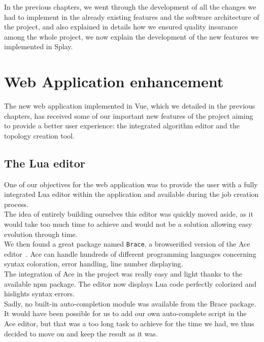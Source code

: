 \documentclass{eplmastersthesis}
\begin{document}
      In the previous chapters, we went through the development of all
      the changes we had to implement in the already existing features
      and the software architecture of the project, and also explained
      in details how we ensured quality insurance among the whole project,
      we now explain the development of the new features we implemented in
      Splay.

      \section{Web Application enhancement}

        The new web application implemented in Vue, which we detailed in
        the previous chapters, has received some of our important new features
        of the project aiming to provide a better user experience: the
        integrated algorithm editor and the topology creation tool.

        \subsection{The Lua editor}

          One of our objectives for the web application was to provide the user
          with a fully integrated Lua editor within the application and
          available during the job creation process.\\
          The idea of entirely building ourselves this editor was quickly
          moved aside, as it would take too much time to achieve and would not
          be a solution allowing easy evolution through time.\\
          We then found a great package named \texttt{Brace}, a browserified
          version of the Ace editor~\cite{Ace}. Ace can handle hundreds of 
          different programming languages concerning syntax coloration,
          error handling, line number displaying.\\

          The integration of Ace in the project was really easy and light thanks
          to the available npm package. The editor now displays Lua code
          perfectly colorized and hislights syntax errors.\\

          Sadly, no built-in auto-completion module was available from the
          Brace package. It would have been possible for us to add our own
          auto-complete script in the Ace editor, but that was a too long
          task to achieve for the time we had, we thus decided to move on and
          keep the result as it was.
\end{document}
